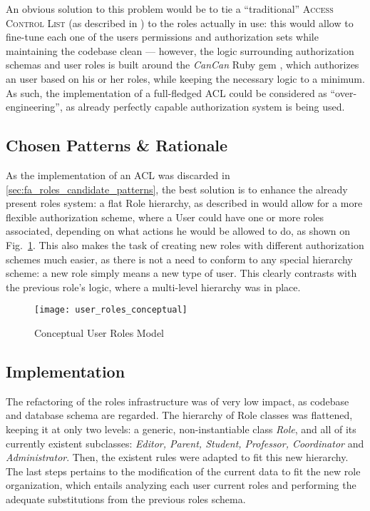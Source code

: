 An obvious solution to this problem would be to tie a ``traditional'' \textsc{Access Control List} (as described in \cite{}) to the roles actually in use: this would allow to fine-tune each one of the users permissions and authorization sets while maintaining the codebase clean --- however, the logic surrounding authorization schemas and user roles is built around the \emph{CanCan} Ruby gem \cite{cancan}, which authorizes an user based on his or her roles, while keeping the necessary logic to a minimum. As such, the implementation of a full-fledged ACL could be considered as ``over-engineering'', as already perfectly capable authorization system is being used.

\subsection{Chosen Patterns \& Rationale}\label{sec:fa_roles_chosen_patterns_rationale}

As the implementation of an ACL was discarded in \ref{sec:fa_roles_candidate_patterns}, the best solution is to enhance the already present roles system: a flat Role hierarchy, as described in \cite{baumer_riehle_role_object} would allow for a more flexible authorization scheme, where a User could have one or more roles associated, depending on what actions he would be allowed to do, as shown on Fig.~\ref{fig:user_roles_conceptual}. This also makes the task of creating new roles with different authorization schemes much easier, as there is not a need to conform to any special hierarchy scheme: a new role simply means a new type of user. This clearly contrasts with the previous role's logic, where a multi-level hierarchy was in place.

\begin{figure}[H]
  \centering
  \texttt{[image: user\_roles\_conceptual]}
  \caption{Conceptual User Roles Model}
  \label{fig:user_roles_conceptual}
\end{figure}

\subsection{Implementation}\label{sec:fa_roles_implementation}

The refactoring of the roles infrastructure was of very low impact, as codebase and database schema are regarded. The hierarchy of Role classes was flattened, keeping it at only two levels: a generic, non-instantiable class \emph{Role}, and all of its currently existent subclasses: \emph{Editor, Parent, Student, Professor, Coordinator} and \emph{Administrator}. Then, the existent rules were adapted to fit this new hierarchy. The last steps pertains to the modification of the current data to fit the new role organization, which entails analyzing each user current roles and performing the adequate substitutions from the previous roles schema. 

